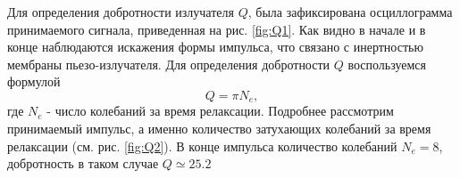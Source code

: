 Для определения добротности излучателя $Q$, была зафиксирована осциллограмма принимаемого сигнала, приведенная на рис.
\ref{fig:Q1}. Как видно в начале и в конце наблюдаются искажения формы импульса, что связано с инертностью мембраны
пьезо-излучателя. 
Для определения добротности $Q$ воспользуемся формулой 
\begin{equation}
	Q = \pi N_e,
	\label{eq:dobr}
\end{equation}
где $N_e$ - число колебаний за время релаксации. Подробнее рассмотрим принимаемый импульс, а именно количество затухающих
колебаний за время релаксации (см. рис. \ref{fig:Q2}). В конце импульса количество колебаний $N_e = 8$, добротность
в таком случае $Q \simeq 25.2$



